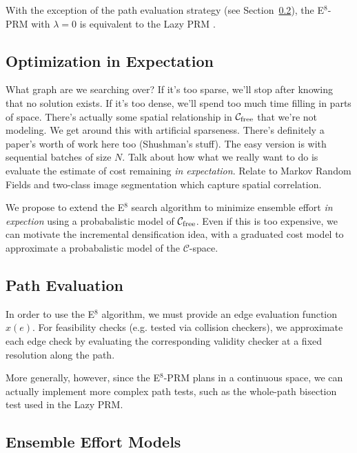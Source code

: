 With the exception of the path evaluation strategy
(see Section~\ref{subsec:prm-path-eval}),
the E$^8$-PRM with $\lambda = 0$
is equivalent to 
the Lazy PRM \citep{bohlin2000lazyprm}.

\subsection{Optimization in Expectation}

What graph are we searching over?
If it's too sparse, we'll stop after knowing that no solution exists.
If it's too dense, we'll spend too much time filling in parts of
space.
There's actually some spatial relationship in
$\mathcal{C}_{\mbox{\scriptsize free}}$ that we're not
modeling.
We get around this with artificial sparseness.
There's definitely a paper's worth of work here too (Shushman's stuff).
The easy version is with sequential batches of size $N$.
Talk about how what we really want to do
is evaluate the estimate of cost remaining
\emph{in expectation}.
Relate to Markov Random Fields and two-class image segmentation
which capture spatial correlation.

We propose to extend the E$^8$ search algorithm
to minimize ensemble effort \emph{in expection}
using a probabalistic model of $\mathcal{C}_{\mbox{\scriptsize free}}$.
Even if this is too expensive,
we can motivate the incremental densification idea,
with a graduated cost model
to approximate a probabalistic model
of the $\mathcal{C}$-space.

\subsection{Path Evaluation}
\label{subsec:prm-path-eval}

In order to use the E$^8$ algorithm,
we must provide an edge evaluation function $x(e)$.
For feasibility checks
(e.g. tested via collision checkers),
we approximate each edge check
by evaluating the corresponding validity checker
at a fixed resolution along the path.

More generally, however,
since the E$^8$-PRM plans in a continuous space,
we can actually implement more complex path tests,
such as the whole-path bisection test used in the
Lazy PRM.

\subsection{Ensemble Effort Models}

